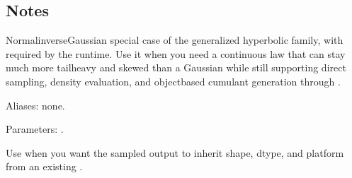 \documentclass[letterpaper,10pt,english]{sphinxmanual}
\begin{document}
\subsection{Notes}
\label{\detokenize{distribution_catalog:id158}}
\sphinxAtStartPar
Normal\sphinxhyphen{}inverse\sphinxhyphen{}Gaussian special case of the generalized hyperbolic family, with  required by the runtime. Use it when you need a continuous law that can stay much more tail\sphinxhyphen{}heavy and skewed than a Gaussian while still supporting direct sampling, density evaluation, and object\sphinxhyphen{}based cumulant generation through .

\sphinxAtStartPar
Aliases: none.

\sphinxAtStartPar
Parameters: .

\sphinxAtStartPar
Use  when you want the sampled output to inherit shape, dtype, and platform from an existing .
\end{document}
